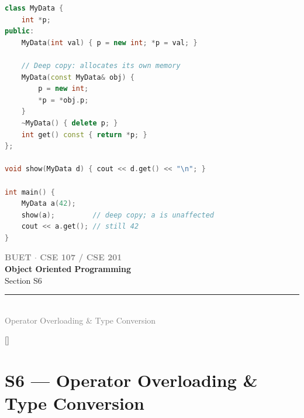 \documentclass[12pt,a3paper]{article}
\newcommand{\secdivider}[4]{%
  \newpage\thispagestyle{empty}%
  \vspace*{\fill}%
  \begin{tcolorbox}[enhanced,colback=#4!7,colframe=#3,boxrule=1.5pt,arc=8pt,
    left=20pt,right=20pt,top=22pt,bottom=22pt,
    shadow={3pt}{-3pt}{0pt}{black!15}]
    \centering
    {\large\textcolor{gray}{\textbf{BUET $\cdot$ CSE 107 / CSE 201}}}\\[8pt]
    {\fontsize{26}{32}\selectfont\bfseries\textcolor{#3}{Object Oriented Programming}}\\[6pt]
    {\fontsize{15}{19}\selectfont\textcolor{dgray}{#1}}\\[12pt]
    \textcolor{#3!60}{\rule{0.5\textwidth}{0.5pt}}\\[6pt]
    {\small\textcolor{gray}{#2}}
  \end{tcolorbox}%
  \vspace*{\fill}\newpage%
}
\begin{document}
\begin{enumerate}
\begin{tcolorbox}[enhanced,breakable,ansbox,colback=cE!4,colframe=cE,
  boxrule=0.8pt,arc=5pt,
  title={\textbf{Answer --- Problems solved by copy constructors}},
  fonttitle=\bfseries\color{white},colbacktitle=cE]
\begin{lstlisting}[language=C++]
class MyData {
    int *p;
public:
    MyData(int val) { p = new int; *p = val; }

    // Deep copy: allocates its own memory
    MyData(const MyData& obj) {
        p = new int;
        *p = *obj.p;
    }
    ~MyData() { delete p; }
    int get() const { return *p; }
};

void show(MyData d) { cout << d.get() << "\n"; }

int main() {
    MyData a(42);
    show(a);         // deep copy; a is unaffected
    cout << a.get(); // still 42
}
\end{lstlisting}

\end{tcolorbox}


\end{enumerate}
\newpage

\secdivider{Section S6}{Operator Overloading \& Type Conversion}{cF}{cF}
\label{sec:S6}
\titleformat{\section}{\large\bfseries\color{cF}}{}{0em}{}[\titlerule]
\section{S6 --- Operator Overloading \& Type Conversion}
\end{document}
